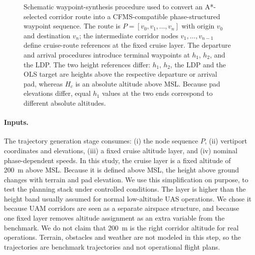 \begin{figure}[!htbp]
{%
}
\caption{Schematic waypoint-synthesis procedure used to convert an A*-selected corridor route into a CFMS-compatible phase-structured waypoint sequence. The route is \(P = [v_0, v_1, \dots, v_n]\) with origin \(v_0\) and destination \(v_n\); the intermediate corridor nodes \(v_1, \dots, v_{n-1}\) define cruise-route references at the fixed cruise layer. The departure and arrival procedures introduce terminal waypoints at \(h_1\), \(h_2\), and the LDP. The two height references differ: \(h_1\), \(h_2\), the LDP and the OLS target are heights above the respective departure or arrival pad, whereas \(H_c\) is an absolute altitude above MSL. Because pad elevations differ, equal \(h_1\) values at the two ends correspond to different absolute altitudes.}
\label{fig:waypoint-synthesis-schematic}
\end{figure}

\paragraph{Inputs.}
The trajectory generation stage consumes:
(i) the node sequence \(P\),
(ii) vertiport coordinates and elevations,
(iii) a fixed cruise altitude layer, and
(iv) nominal phase-dependent speeds.
In this study, the cruise layer is a fixed altitude of \SI{200}{m} above MSL. Because it is defined above MSL, the height above ground changes with terrain and pad elevation. We use this simplification on purpose, to test the planning stack under controlled conditions. The layer is higher than the height band usually assumed for normal low-altitude UAS operations. We chose it because UAM corridors are seen as a separate airspace structure, and because one fixed layer removes altitude assignment as an extra variable from the benchmark. We do not claim that \SI{200}{m} is the right corridor altitude for real operations. Terrain, obstacles and weather are not modeled in this step, so the trajectories are benchmark trajectories and not operational flight plans.

